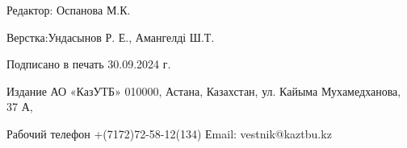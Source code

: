 \newpage

\thispagestyle{empty}
\null
\vfill
\begin{center}
Редактор: Оспанова М.К.

Верстка:Ундасынов Р. Е., Амангелді Ш.Т.

Подписано в печать 30.09.2024 г.

Издание АО «КазУТБ» 010000, Астана, Казахстан, ул. Кайыма Мухамедханова, 37 А,

Рабочий телефон +(7172)72-58-12(134) Еmail: vestnik@kaztbu.kz
\end{center}
\vfill
\null

